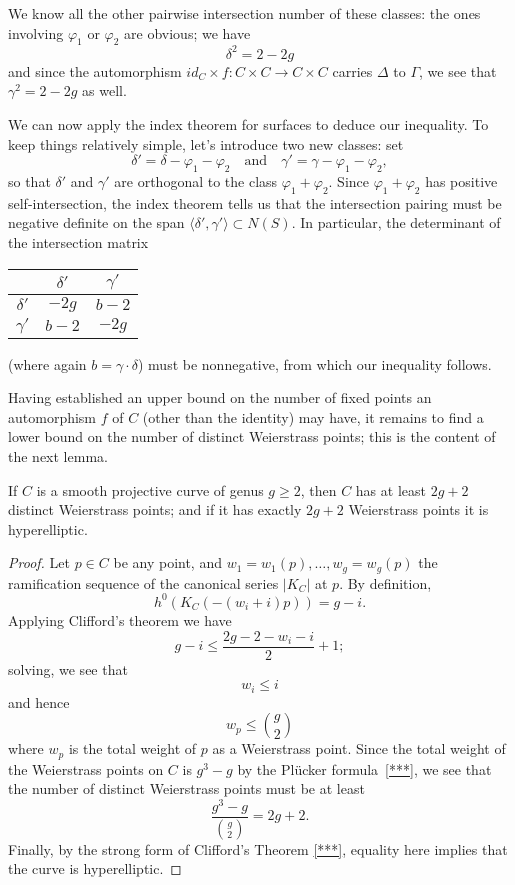 We know all the other pairwise intersection number of these classes: the ones involving $\varphi_1$ or $\varphi_2$ are obvious; we have
$$
\delta^2 = 2 - 2g
$$
and since the automorphism $id_C \times f : C\times C \to C \times C$ carries $\Delta$ to $\Gamma$, we see that $\gamma^2 = 2-2g$ as well.

We can now apply the index theorem for surfaces to deduce our inequality. To keep things relatively simple, let's introduce two new classes: set
$$
\delta' = \delta - \varphi_1 - \varphi_2 \quad \text{and} \quad \gamma' = \gamma - \varphi_1 - \varphi_2,
$$
so that $\delta'$ and $\gamma'$ are orthogonal to the class $\varphi_1 + \varphi_2$. Since $\varphi_1 + \varphi_2$ has positive self-intersection, the index theorem tells us that the intersection pairing must be negative definite on the span $\langle \delta',\gamma' \rangle \subset N(S)$. In particular, the determinant of the intersection matrix
\begin{center}
\begin{tabular}{c|c|c}
& $\delta'$ &  $\gamma'$  \\
\hline
$\delta'$ & $-2g$ & $b-2$ \\
\hline
$\gamma'$ & $b-2$ & $-2g$ 
\end{tabular}
\end{center}
(where again $b = \gamma \cdot \delta$) must be nonnegative, from which our inequality follows.

Having established an upper bound on the number of fixed points an automorphism $f$ of $C$ (other than the identity) may have, it remains to find a lower bound on the number of distinct Weierstrass points; this is the content of the next lemma.


\begin{lemma}
If $C$ is a smooth projective curve of genus $g \geq 2$, then $C$ has at least $2g+2$ distinct Weierstrass points; and if it has exactly $2g+2$ Weierstrass points it is hyperelliptic.
\end{lemma}

\begin{proof}
Let $p \in C$ be any point, and $w_1=w_1(p),\dots,w_g = w_g(p)$ the ramification sequence of the canonical series $|K_C|$ at $p$. By definition, 
$$
h^0(K_C(-(w_i+i)p)) = g - i.
$$
Applying Clifford's theorem we have
$$
g-i \leq \frac{2g - 2 - w_i - i}{2} + 1;
$$
solving, we see that
$$
w_i \leq i
$$
and hence
$$
w_p \leq \binom{g}{2}
$$
where $w_p$ is the total weight of $p$ as a Weierstrass point. Since the total weight of the Weierstrass points on $C$ is $g^3-g$ by the Pl\"ucker formula~\ref{***}, we see that the number of distinct Weierstrass points must be at least
$$
\frac{g^3-g}{\binom{g}{2}} = 2g+2.
$$
Finally, by the strong form of Clifford's Theorem \ref{***}, equality here implies that the curve is hyperelliptic.
\end{proof}




